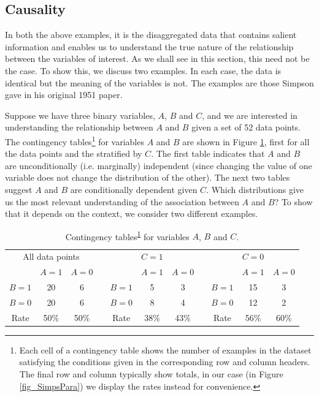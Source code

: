 \subsection{Causality}

In both the above examples, it is the disaggregated data that contains salient information and enables us to understand the true nature of the relationship between the variables of interest. As we shall see in this section, this need not be the case. To show this, we discuss two examples. In each case, the data is identical but the meaning of the variables is not. The examples are those Simpson gave in his original 1951 paper\cite{Simpson}.

Suppose we have three binary variables, $A$, $B$ and $C$, and we are interested in understanding the relationship between $A$ and $B$ given a set of 52 data points. The contingency tables\footnote{Each cell of a contingency table shows the number of examples in the dataset satisfying the conditions given in the corresponding row and column headers. The final row and column typically show totals, in our case (in Figure \ref{fig_SimpsPara}) we display the rates instead for convenience.\label{fnt_ConTab}} for variables $A$ and $B$ are shown in Figure \ref{tab_SimpPara}, first for all the data points and the stratified by $C$. The first table indicates that $A$ and $B$ are unconditionally (i.e. marginally) independent (since changing the value of one variable does not change the distribution of the other). The next two tables suggest $A$ and $B$ are conditionally dependent given $C$. Which distributions give us the most relevant understanding of the association between $A$ and $B$? To show that it depends on the context, we consider two different examples.
%
\begin{table}[h!]
\centering
\caption[Contingency tables for variables $A$ and $B$.]{Contingency tables\textsuperscript{\ref{fnt_ConTab}} for variables $A$, $B$ and $C$.}
\label{tab_SimpPara}
\vspace{10pt}
\begin{tabular}{|c|c|c|c|c|c|c|c|c|c|c|}
\multicolumn{3}{c}{All data points} & \multicolumn{5}{c}{$C=1$} & \multicolumn{3}{c}{$C=0$} \\
\cline{1-3} \cline{5-7} \cline{9-11}
       & $A=1$ & $A=0$              & &       & $A=1$ & $A=0$ & &       & $A=1$ & $A=0$     \\
\cline{1-3} \cline{5-7} \cline{9-11}
$B=1$  & 20    & 6                  & & $B=1$ &  5    &  3    & & $B=1$ & 15    & 3         \\
$B=0$  & 20    & 6                  & & $B=0$ &  8    &  4    & & $B=0$ & 12    & 2         \\
\cline{1-3} \cline{5-7} \cline{9-11}
Rate   & 50\%  & 50\%               & & Rate  & 38\%  & 43\%  & & Rate  & 56\%  & 60\%      \\
\cline{1-3} \cline{5-7} \cline{9-11}
\end{tabular}
\end{table}

